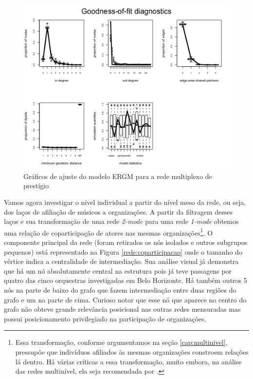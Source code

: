 \documentclass[a4paper, 12pt, openright, oneside, german, french, english, brazil]{abntex2}
\begin{document}
	
	\begin{figure}[!ht]
		\centering
		\caption{Gráficos de ajuste do modelo ERGM para a rede multiplexo de prestígio}
		\label{gof:prestigio}
		\includegraphics[scale=.8]{gof_individuos.png}
	\end{figure}
	
	Vamos agora investigar o nível individual a partir do nível meso da rede, ou seja, dos laços de afiliação de músicos a organizações. A partir da filtragem desses laços e sua transformação de uma rede \textit{2-mode} para uma rede \textit{1-mode} obtemos uma relação de coparticipação de atores nas mesmas organizações\footnote{Essa transformação, conforme argumentamos na seção \ref{cap:multinivel}, pressupõe que indivíduos afiliados às mesmas organizações constroem relações lá dentro. Há várias críticas a essa transformação, muito embora, na análise das redes multinível, ela seja recomendada por .}. O componente principal da rede (foram retirados os nós isolados e outros subgrupos pequenos) está representado na Figura \ref{rede:coparticipacao} onde o tamanho do vértice indica a centralidade de intermediação. Sua análise visual já demonstra que há um nó absolutamente central na estrutura pois já teve passagens por quatro das cinco orquestras investigadas em Belo Horizonte. Há também outros 5 nós na parte de baixo do grafo que fazem intermediação entre duas regiões do grafo e um na parte de cima. Curioso notar que esse nó que aparece no centro do grafo não obteve grande relevância posicional nas outras redes mensuradas mas possui posicionamento privilegiado na participação de organizações.
	
\end{document}
